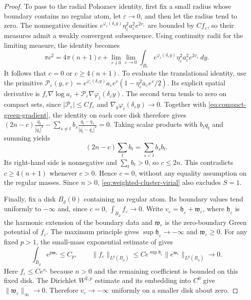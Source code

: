 \documentclass[11pt,reqno]{amsart}
\numberwithin{equation}{section}
\theoremstyle{definition}
\theoremstyle{remark}
\newcommand{\eps}{\varepsilon}
\newcommand{\etae}{\eta_{\eps}}
\newcommand{\de}{\delta_{\eps}}
\begin{document}
\begin{proof}
To pass to the radial Pohozaev identity, first fix a small radius
whose boundary contains no regular atom, let $\eps\to0$, and then
let the radius tend to zero. The nonnegative densities
$e^{\varphi_i(\de y)}\etae^2a_\eps^2e^{2v_\eps}$ are bounded by
$C f_\eps$, so their measures admit a weakly convergent subsequence.
Using continuity radii for the limiting measure, the identity becomes
\[
 \pi c^2=4\pi(n+1)c+
 \lim_{r\downarrow0}\lim_{\eps\to0}
 \int_{B_r}e^{\varphi_i(\de y)}
                  \etae^2a_\eps^2e^{2v_\eps}\,dy.
\]
It follows that $c=0$ or $c\ge4(n+1)$. To evaluate the translational
identity, use the primitive
\(\mathcal P_\eps(y,v)=e^{\varphi_i(\de y)}a_\eps e^v (1-\etae^2a_\eps e^v/2).\)
Its explicit spatial derivative is
$f_\eps\nabla\log a_\eps+\mathcal P_\eps\nabla\varphi_i(\de y)$.
The second term tends to zero on compact sets, since
$|\mathcal P_\eps|\le C f_\eps$ and $\nabla_y\varphi_i(\de y)\to0$.
Together with \eqref{eq:compact-green-gradient}, the identity on
each core disk therefore gives
\(
 (2n-c)\frac{q_t}{|q_t|^2}
 -\sum_{s\ne t}b_s\frac{q_t-q_s}{|q_t-q_s|^2}=0.
\)
Taking scalar products with $b_tq_t$ and summing yields
\begin{equation}\label{eq:weighted-cluster-virial}
 (2n-c)\sum_t b_t=\sum_{s<t}b_sb_t.
\end{equation}
Its right-hand side is nonnegative and $\sum_t b_t>0$, so
$c\le2n$. This contradicts $c\ge4(n+1)$ whenever $c>0$.
Hence $c=0$, without any equality assumption on the regular masses.
Since $n>0$, \eqref{eq:weighted-cluster-virial} also excludes $S=1$.

Finally, fix a disk $B_\varrho(0)$ containing no regular atom.
Its boundary values tend uniformly to $-\infty$ and, since $c=0$,
$\int_{B_\varrho}f_\eps\to0$. Write
$v_\eps=\mathfrak h_\eps+\mathfrak w_\eps$, where
$\mathfrak h_\eps$ is the harmonic extension of the boundary data
and $\mathfrak w_\eps$ is the zero-boundary Green potential of
$f_\eps$. The maximum principle gives
$\sup\mathfrak h_\eps\to-\infty$ and $\mathfrak w_\eps\ge0$.
For any fixed $p>1$, the small-mass exponential estimate of
\cite{BM} gives
\[
 \int_{B_\varrho}e^{p\mathfrak w_\eps}\le C_p,\qquad
 \|f_\eps\|_{L^p(B_\varrho)}
   \le C e^{\sup\mathfrak h_\eps}
                      \|e^{\mathfrak w_\eps}\|_{L^p(B_\varrho)}
   \longrightarrow0.
\]
Here $f_\eps\le C e^{v_\eps}$ because $n>0$ and the remaining
coefficient is bounded on this fixed disk. The Dirichlet
$W^{2,p}$ estimate and its embedding into $C^0$ give
$\|\mathfrak w_\eps\|_\infty\to0$. Therefore
$v_\eps\to-\infty$ uniformly on a smaller disk about zero.
\end{proof}
\end{document}
